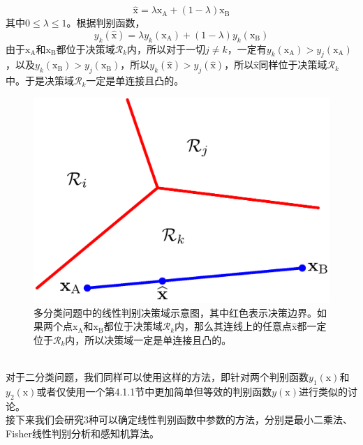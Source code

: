 \documentclass[b5paper]{book}
\numberwithin{equation}{chapter}
\newcommand {\bx} {\boldsymbol{\mathrm{x}}}
\newcommand {\calR} {\mathcal{R}}
\begin{document}
{\begin{equation}
		\hat{\bx} = \lambda \bx_{\mathrm{A}}+(1-\lambda)\bx_{\mathrm{B}}
	\end{equation}
	其中$0 \leqslant \lambda \leqslant 1$。根据判别函数，
	\begin{equation}
		y_k(\hat{\bx}) = \lambda y_k(\bx_{\mathrm{A}}) + (1-\lambda)y_k(\bx_{\mathrm{B}})
	\end{equation}
	由于$\bx_{\mathrm{A}}$和$\bx_{\mathrm{B}}$都位于决策域$\calR_k$内，所以对于一切$j \neq k$，一定有$y_k(\bx_{\mathrm{A}}) > y_j(\bx_{\mathrm{A}})$，以及$y_k(\bx_{\mathrm{B}}) > y_j(\bx_{\mathrm{B}})$，所以$y_k(\hat{\bx})>y_j(\hat{\bx})$，所以$\hat{\bx}$同样位于决策域$\calR_k$中。于是决策域$\calR_k$一定是单连接且凸的。
	\begin{figure}[ht]
		\centering
		\includegraphics[scale=0.8]{Images/4-3.png}
		\caption{多分类问题中的线性判别决策域示意图，其中红色表示决策边界。如果两个点$\bx_{\mathrm{A}}$和$\bx_{\mathrm{B}}$都位于决策域$\calR_k$内，那么其连线上的任意点$\hat{\bx}$都一定位于$\calR_k$内，所以决策域一定是单连接且凸的。}
		\label{fig:4-3}
	\end{figure}
	\\
	\indent 对于二分类问题，我们同样可以使用这样的方法，即针对两个判别函数$y_1(\bx)$和$y_2(\bx)$或者仅使用一个第4.1.1节中更加简单但等效的判别函数$y(\bx)$进行类似的讨论。\\
	\indent 接下来我们会研究3种可以确定线性判别函数中参数的方法，分别是最小二乘法、Fisher线性判别分析和感知机算法。
	}
\end{document}

